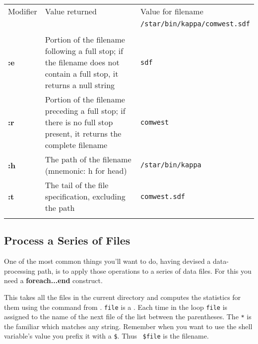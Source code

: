 \documentclass[twoside,11pt,nolof]{starlink}
\providecommand{\KAPPAref}{\xref{{\footnotesize KAPPA}}{sun95}{}}
\begin{document}
\begin{center}
\begin{tabular}{lp{62mm}l}
Modifier & Value returned & Value for filename \\
 & & \texttt{/star/bin/kappa/comwest.sdf} \\ \hline
\\
\textbf{:e} & Portion of the filename following a full stop; if the filename does
not contain a full stop, it returns a null string & \texttt{sdf} \\
\textbf{:r} & Portion of the filename preceding a full stop; if there is no full stop
present, it returns the complete filename & \texttt{comwest} \\
\textbf{:h} & The path of the filename (mnemonic: h for head) & \texttt{/star/bin/kappa} \\
\textbf{:t} & The tail of the file specification, excluding the path &
                                         \texttt{comwest.sdf} \\
\\ \hline
\end{tabular}
\end{center}
\medskip

\newpage
\subsection{Process a Series of Files
\label{sc4_se_series_files}}

One of the most common things you'll want to do, having devised
a data-processing path, is to apply those operations to a series
of data files.   For this you need a \textbf{foreach...end} construct.

\begin{small}
\end{small}
This takes all the  files in the
current directory and computes the statistics for them using the
 command from \KAPPAref\@.  \texttt{file}
is a .  Each time in the
loop \texttt{file} is assigned to the name of the next file of the list
between the parentheses.  The \texttt{*} is the familiar
 which
matches any string.  Remember when you want to use the shell
variable's value you prefix it with a \texttt{\$}.  Thus {\tt
\$file} is the filename.
\end{document}
